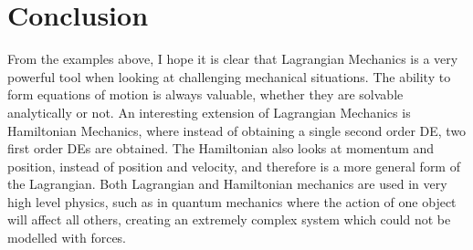 \documentclass{article}
\begin{document}
\section{Conclusion}
From the examples above, I hope it is clear that Lagrangian Mechanics is a very powerful tool when looking at challenging mechanical situations. The ability to form equations of motion is always valuable, whether they are solvable analytically or not. An interesting extension of Lagrangian Mechanics is Hamiltonian Mechanics, where instead of obtaining a single second order DE, two first order DEs are obtained. The Hamiltonian also looks at momentum and position, instead of position and velocity, and therefore is a more general form of the Lagrangian. Both Lagrangian and Hamiltonian mechanics are used in very high level physics, such as in quantum mechanics where the action of one object will affect all others, creating an extremely complex system which could not be modelled with forces.
\end{document}
